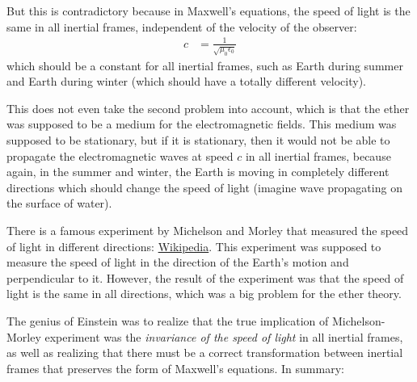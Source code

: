 But this is contradictory because in Maxwell's equations, the speed of light is the same in all inertial frames, independent of the velocity of the observer:
\begin{align}
  c & = \frac{1}{\sqrt{\mu_0 \epsilon_0}}
\end{align}
which should be a constant for all inertial frames, such as Earth during summer and Earth during winter (which should have a totally different velocity).

This does not even take the second problem into account, which is that the ether was supposed to be a medium for the electromagnetic fields.
This medium was supposed to be stationary, but if it is stationary, then it would not be able to propagate the electromagnetic waves at speed $c$ in all inertial frames, because again, in the summer and winter, the Earth is moving in completely different directions which should change the speed of light (imagine wave propagating on the surface of water).

There is a famous experiment by Michelson and Morley that measured the speed of light in different directions: \href{https://en.wikipedia.org/wiki/Michelson-Morley_experiment}{Wikipedia}.
This experiment was supposed to measure the speed of light in the direction of the Earth's motion and perpendicular to it.
However, the result of the experiment was that the speed of light is the same in all directions, which was a big problem for the ether theory.

The genius of Einstein was to realize that the true implication of Michelson-Morley experiment was the \emph{invariance of the speed of light} in all inertial frames, as well as realizing that there must be a correct transformation between inertial frames that preserves the form of Maxwell's equations.
In summary:
